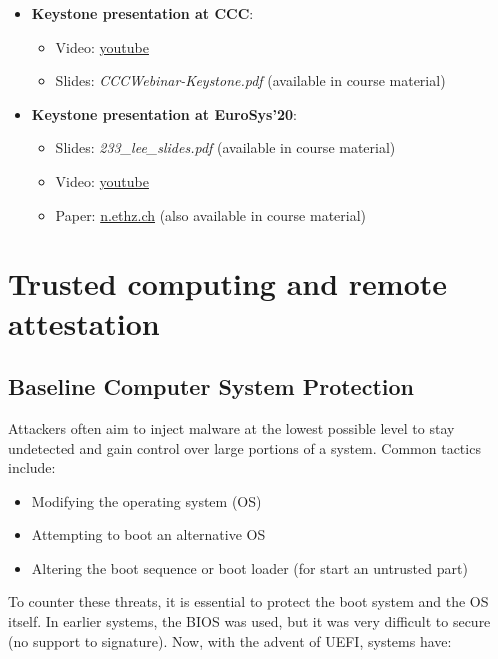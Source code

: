 \begin{itemize}
    \item \textbf{Keystone presentation at CCC}:
    \begin{itemize}
        \item Video: \href{https://www.youtube.com/watch?v=ITA3FfjKqNk}{youtube}
        \item Slides: \textit{CCCWebinar-Keystone.pdf} (available in course material)
    \end{itemize}
    
    \item \textbf{Keystone presentation at EuroSys'20}:
    \begin{itemize}
        \item Slides: \textit{233\_lee\_slides.pdf} (available in course material)
        \item Video: \href{https://www.youtube.com/watch?v=S8MmKBCoPSg}{youtube}
        \item Paper: \href{https://n.ethz.ch/~sshivaji/publications/keystone_eurosys20.pdf}{n.ethz.ch} (also available in course material)
    \end{itemize}
\end{itemize}

\section{Trusted computing and remote attestation}

\subsection{Baseline Computer System Protection}

Attackers often aim to inject malware at the lowest possible level to stay undetected and gain control over large portions of a system. Common tactics include:

\begin{itemize}
    \item Modifying the operating system (OS)
    \item Attempting to boot an alternative OS
    \item Altering the boot sequence or boot loader (for start an untrusted part)
\end{itemize}

To counter these threats, it is essential to protect the boot system and the OS itself. In earlier systems, the BIOS was used, but it was very difficult to secure (no support to signature). Now, with the advent of UEFI, systems have:

